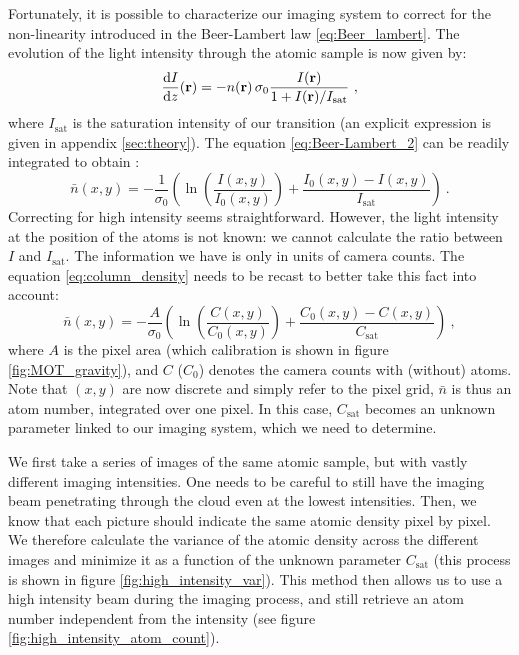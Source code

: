 \documentclass[11pt]{article}
\numberwithin{equation}{section}
\numberwithin{figure}{section}
\begin{document}
Fortunately, it is possible to characterize our imaging system to correct for the non-linearity introduced in the Beer-Lambert law \eqref{eq:Beer_lambert}. The evolution of the light intensity through the atomic sample is now given by:
%
\begin{equation}
	\label{eq:Beer-Lambert_2}
	\dv{I}{z} \/ (\mathbf{r}) = - n(\mathbf{r}) \, \sigma_0 \frac{I(\mathbf{r})}{1 + I(\mathbf{r}) / I_\text{sat}}~,
\end{equation}
%
where $I_\text{sat}$ is the saturation intensity of our transition (an explicit expression is given in appendix \ref{sec:theory}). The equation \eqref{eq:Beer-Lambert_2} can be readily integrated to obtain \citep{2007_reinaudi}:
%
\begin{equation}
	\label{eq:column_density}
	 \bar{n}(x, y) = - \frac{1}{\sigma_0} \left( \ln(\frac{I(x, y)}{I_0(x,y)}) + \frac{I_0(x,y) - I(x, y)}{I_\text{sat}}\right)~.
\end{equation}
%
Correcting for high intensity seems straightforward. However, the light intensity at the position of the atoms is not known: we cannot calculate the ratio between $I$ and $I_\text{sat}$. The information we have is only in units of camera counts. The equation \eqref{eq:column_density} needs to be recast to better take this fact into account:
%
\begin{equation}
	\label{eq:column_density_counts}
	 \bar{n}(x, y) = - \frac{A}{\sigma_0} \left( \ln(\frac{C(x, y)}{C_0(x,y)}) + \frac{C_0(x,y) - C(x, y)}{C_\text{sat}}\right)~,
\end{equation}
%
where $A$ is the pixel area (which calibration is shown in figure \ref{fig:MOT_gravity}), and $C$ ($C_0$) denotes the camera counts with (without) atoms. Note that $(x, y)$ are now discrete and simply refer to the pixel grid, $\bar{n}$ is thus an atom number, integrated over one pixel. In this case, $C_\text{sat}$ becomes an unknown parameter linked to our imaging system, which we need to determine. 

We first take a series of images of the same atomic sample, but with vastly different imaging intensities. One needs to be careful to still have the imaging beam penetrating through the cloud even at the lowest intensities. Then, we know that each picture should indicate the same atomic density pixel by pixel. We therefore calculate the variance of the atomic density across the different images and minimize it as a function of the unknown parameter $C_\text{sat}$ (this process is shown in figure \ref{fig:high_intensity_var}). This method then allows us to use a high intensity beam during the imaging process, and still retrieve an atom number independent from the intensity (see figure \ref{fig:high_intensity_atom_count}).
\end{document}
